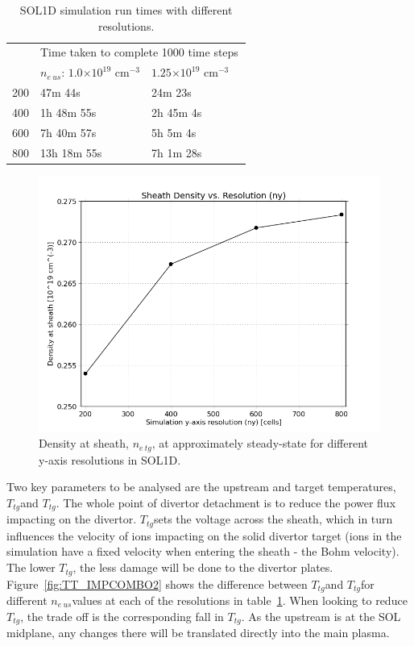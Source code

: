 \documentclass[11pt, twocolumn]{article}  %
\providecommand{\e}[1]{\ensuremath{\times 10^{#1}}} %
\providecommand{\neus}{$n_{e~us}$} %
\providecommand{\netg}{$n_{e~tg}$} %
\providecommand{\Tus}{$T_{tg}$} %
\providecommand{\Ttg}{$T_{tg}$} %
\begin{document}
\begin{table}[]
\caption{SOL1D simulation run times with different resolutions.}
\label{tab:sol1dres}
\begin{tabular}{l|l|l|l}
\multicolumn{1}{l|}{\multirow{2}{*}{}} & \multicolumn{3}{l}{Time taken to complete 1000 time steps}    \\ \cline{2-4} 
 \multicolumn{1}{l|}{Resolution}        & \multicolumn{1}{l|}{\neus: $1.0\e{19}$ cm$^{-3}$} & \multicolumn{1}{l|}{$1.25\e{19}$ cm$^{-3}$}  &  \\ \hline
                   200                 &      47m 44s          &    24m 23s         &  \\
                   400                 &      1h 48m 55s       &    2h 45m 4s       &  \\
                   600                 &      7h 40m 57s       &    5h 5m 4s        &  \\
                   800                 &      13h 18m 55s      &    7h 1m 28s       &  
\end{tabular}
\end{table}

\begin{figure}
\includegraphics[scale=0.4]{Figures/sol1d/RichExtrp_neres.PNG}
\centering
\caption{Density at sheath, \netg, at approximately steady-state for different y-axis resolutions in SOL1D.}\label{fig:RichExtrp_neres}
\end{figure}

Two key parameters to be analysed are the upstream and target temperatures, \Tus and \Ttg. The whole point of divertor detachment is to reduce the power flux impacting on the divertor. \Ttg sets the voltage across the sheath, which in turn influences the velocity of ions impacting on the solid divertor target (ions in the simulation have a fixed velocity when entering the sheath - the Bohm velocity). The lower \Ttg, the less damage will be done to the divertor plates. Figure~\ref{fig:TT_IMPCOMBO2} shows the difference between \Tus and \Ttg for different \neus values at each of the resolutions in table~\ref{tab:sol1dres}. When looking to reduce \Ttg, the trade off is the corresponding fall in \Tus. As the upstream is at the SOL midplane, any changes there will be translated directly into the main plasma. 
\end{document}
